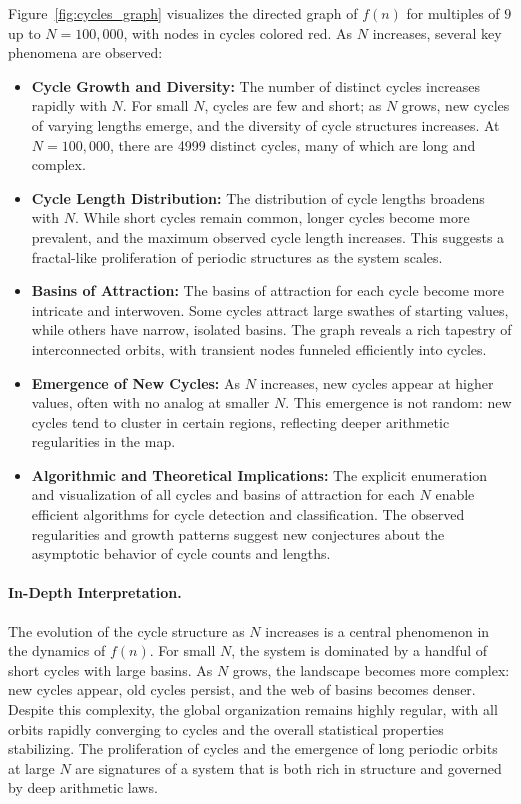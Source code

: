 \documentclass[12pt]{article}
\begin{document}
Figure~\ref{fig:cycles_graph} visualizes the directed graph of $f(n)$ for multiples of $9$ up to $N=100,000$, with nodes in cycles colored red. As $N$ increases, several key phenomena are observed:
\begin{itemize}
    \item \textbf{Cycle Growth and Diversity:} The number of distinct cycles increases rapidly with $N$. For small $N$, cycles are few and short; as $N$ grows, new cycles of varying lengths emerge, and the diversity of cycle structures increases. At $N=100,000$, there are 4999 distinct cycles, many of which are long and complex.
    \item \textbf{Cycle Length Distribution:} The distribution of cycle lengths broadens with $N$. While short cycles remain common, longer cycles become more prevalent, and the maximum observed cycle length increases. This suggests a fractal-like proliferation of periodic structures as the system scales.
    \item \textbf{Basins of Attraction:} The basins of attraction for each cycle become more intricate and interwoven. Some cycles attract large swathes of starting values, while others have narrow, isolated basins. The graph reveals a rich tapestry of interconnected orbits, with transient nodes funneled efficiently into cycles.
    \item \textbf{Emergence of New Cycles:} As $N$ increases, new cycles appear at higher values, often with no analog at smaller $N$. This emergence is not random: new cycles tend to cluster in certain regions, reflecting deeper arithmetic regularities in the map.
    \item \textbf{Algorithmic and Theoretical Implications:} The explicit enumeration and visualization of all cycles and basins of attraction for each $N$ enable efficient algorithms for cycle detection and classification. The observed regularities and growth patterns suggest new conjectures about the asymptotic behavior of cycle counts and lengths.
\end{itemize}

\paragraph{In-Depth Interpretation.} The evolution of the cycle structure as $N$ increases is a central phenomenon in the dynamics of $f(n)$. For small $N$, the system is dominated by a handful of short cycles with large basins. As $N$ grows, the landscape becomes more complex: new cycles appear, old cycles persist, and the web of basins becomes denser. Despite this complexity, the global organization remains highly regular, with all orbits rapidly converging to cycles and the overall statistical properties stabilizing. The proliferation of cycles and the emergence of long periodic orbits at large $N$ are signatures of a system that is both rich in structure and governed by deep arithmetic laws.
\end{document}
